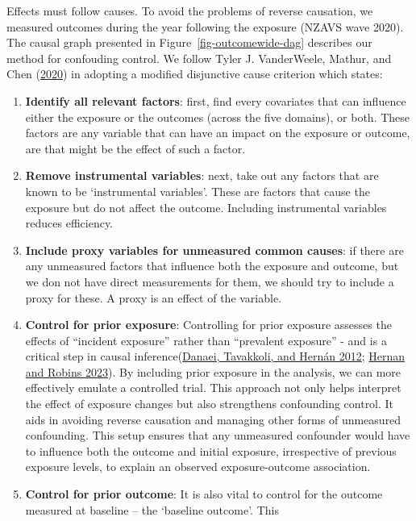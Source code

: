 \documentclass[
  singlecolumn]{report}
\begin{document}
Effects must follow causes. To avoid the problems of reverse causation,
we measured outcomes during the year following the exposure (NZAVS wave
2020). The causal graph presented in Figure~\ref{fig-outcomewide-dag}
describes our method for confouding control. We follow Tyler J.
VanderWeele, Mathur, and Chen
(\protect\hyperlink{ref-vanderweele2020}{2020}) in adopting a modified
disjunctive cause criterion which states:

\begin{enumerate}
\def\labelenumi{\arabic{enumi}.}
\item
  \textbf{Identify all relevant factors}: first, find every covariates
  that can influence either the exposure or the outcomes (across the
  five domains), or both. These factors are any variable that can have
  an impact on the exposure or outcome, are that might be the effect of
  such a factor.
\item
  \textbf{Remove instrumental variables}: next, take out any factors
  that are known to be `instrumental variables'. These are factors that
  cause the exposure but do not affect the outcome. Including
  instrumental variables reduces efficiency.
\item
  \textbf{Include proxy variables for unmeasured common causes}: if
  there are any unmeasured factors that influence both the exposure and
  outcome, but we don not have direct measurements for them, we should
  try to include a proxy for these. A proxy is an effect of the
  variable.
\item
  \textbf{Control for prior exposure}: Controlling for prior exposure
  assesses the effects of ``incident exposure'' rather than ``prevalent
  exposure'' - and is a critical step in causal
  inference(\protect\hyperlink{ref-danaei2012}{Danaei, Tavakkoli, and
  Hernán 2012}; \protect\hyperlink{ref-hernan2023}{Hernan and Robins
  2023}). By including prior exposure in the analysis, we can more
  effectively emulate a controlled trial. This approach not only helps
  interpret the effect of exposure changes but also strengthens
  confounding control. It aids in avoiding reverse causation and
  managing other forms of unmeasured confounding. This setup ensures
  that any unmeasured confounder would have to influence both the
  outcome and initial exposure, irrespective of previous exposure
  levels, to explain an observed exposure-outcome association.
\item
  \textbf{Control for prior outcome}: It is also vital to control for
  the outcome measured at baseline -- the `baseline outcome'. This

\end{enumerate}
\end{document}
